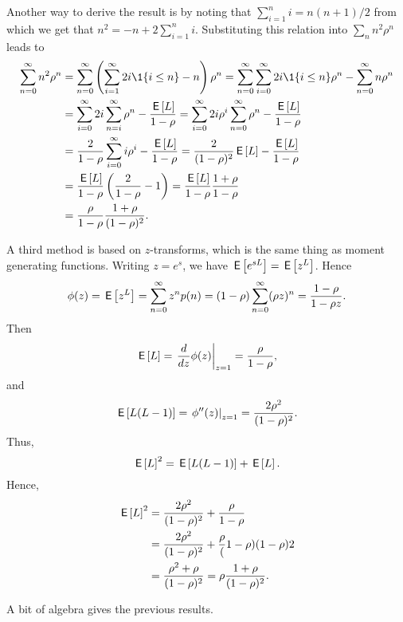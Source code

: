 \begin{exercise}
\begin{solution}
Another way to derive the result is by noting that
$\sum_{i=1}^n i= n(n+1)/2$ from which we get that
$n^2 = -n + 2\sum_{i=1}^n i$. Substituting this relation into
$\sum_n n^2 \rho^n$ leads to
\begin{equation*}
  \begin{split}
    \sum_{n=0}^\infty n^2 \rho^n 
&=    \sum_{n=0}^\infty \left(\sum_{i=1}^\infty 2i \1{i\leq n}  - n\right)\rho^n 
=    \sum_{n=0}^\infty \sum_{i=0}^\infty 2i\1{i\leq n}\rho^n  - \sum_{n=0}^\infty n\rho^n \\
&=    \sum_{i=0}^\infty 2i \sum_{n=i}^\infty \rho^n  - \frac{\E L}{1-\rho} 
=    \sum_{i=0}^\infty 2i \rho^i \sum_{n=0}^\infty \rho^n  - \frac{\E L}{1-\rho} \\
&=    \frac2{1-\rho} \sum_{i=0}^\infty i \rho^i   - \frac{\E L}{1-\rho} 
=    \frac2{(1-\rho)^2} \E L - \frac{\E L}{1-\rho} \\
&=    \frac{\E L}{1-\rho}  \left(\frac2{1-\rho}  - 1\right) 
=    \frac{\E L}{1-\rho}  \frac{1+\rho}{1-\rho} \\
&=    \frac{\rho}{1-\rho}  \frac{1+\rho}{(1-\rho)^2}.
\end{split}
\end{equation*}

A third method is based on $z$-transforms, which is the same thing as moment generating functions. Writing $z=e^s$, we have $\,\mathsf{E}\left[e^{s L}\right] = \,\mathsf{E}\left[z^L\right]$. Hence
\begin{equation*}
  \phi(z) = \,\mathsf{E}\left[z^L\right] = \sum_{n=0}^\infty z^n p(n) = (1-\rho) \sum_{n=0}^\infty (\rho z)^n = \frac{1-\rho}{1-\rho z}.
\end{equation*}
Then 
\begin{equation*}
  \,\mathsf{E}\left[L\right] = \left.\frac d {dz} \phi(z)\right|_{z=1} = \frac{\rho}{1-\rho},
\end{equation*}
and 
\begin{equation*}
  \,\mathsf{E}\left[L(L-1)\right]= \left.\phi''(z)\right|_{z=1} = \frac{2\rho^2}{(1-\rho)^2}.
\end{equation*}
Thus,
\begin{equation*}
\,\mathsf{E}\left[L\right]^2 =   \,\mathsf{E}\left[L(L-1)\right] + \,\mathsf{E}\left[L\right].
\end{equation*}
Hence,
\begin{equation*}
  \begin{split}
\,\mathsf{E}\left[L\right]^2 
&=   \frac{2\rho^2}{(1-\rho)^2} + \frac\rho{1-\rho} \\
&=   \frac{2\rho^2}{(1-\rho)^2} + \frac\rho(1-\rho){(1-\rho)2} \\
&=   \frac{\rho^2+\rho}{(1-\rho)^2} = \rho \frac{1+\rho}{(1-\rho)^2}.
  \end{split}
\end{equation*}

A bit of algebra gives the previous results.
  \end{solution}
\end{exercise}



